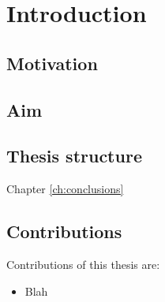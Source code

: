 \chapter{Introduction}
\label{ch:intro}


\section{Motivation}



\section{Aim}



\clearpage

\section{Thesis structure}


\begin{description}
\item[Chapter \ref{ch:conclusions}]
\end{description}


\section{Contributions}
Contributions of this thesis are:
\begin{itemize}
\item Blah %
\end{itemize}
